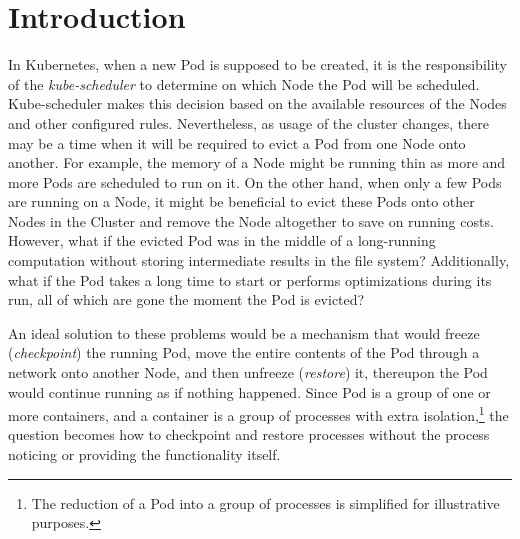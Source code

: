 \documentclass[
  digital,     %
  oneside,     %
  nosansbold,  %
  nocolorbold, %
  lof,         %
  nolot,         %
]{fithesis4}
\begin{document}
\chapter*{Introduction}

In Kubernetes, when a new Pod is supposed to be created, it is the responsibility of the \emph{kube-scheduler} to determine on which Node the Pod will be scheduled. Kube-scheduler makes this decision based on the available resources of the Nodes and other configured rules. Nevertheless, as usage of the cluster changes, there may be a time when it will be required to evict a Pod from one Node onto another. For example, the memory of a Node might be running thin as more and more Pods are scheduled to run on it. On the other hand, when only a few Pods are running on a Node, it might be beneficial to evict these Pods onto other Nodes in the Cluster and remove the Node altogether to save on running costs. However, what if the evicted Pod was in the middle of a long-running computation without storing intermediate results in the file system? Additionally, what if the Pod takes a long time to start or performs optimizations during its run, all of which are gone the moment the Pod is evicted?

An ideal solution to these problems would be a mechanism that would freeze (\emph{checkpoint}) the running Pod, move the entire contents of the Pod through a network onto another Node, and then unfreeze (\emph{restore}) it, thereupon the Pod would continue running as if nothing happened. Since Pod is a group of one or more containers, and a container is a group of processes with extra isolation,\footnote{The reduction of a Pod into a group of processes is simplified for illustrative purposes.} the question becomes how to checkpoint and restore processes without the process noticing or providing the functionality itself.
\end{document}
